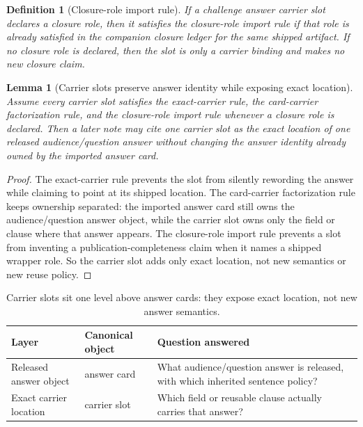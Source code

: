 \documentclass[11pt]{article}
\newtheorem{definition}{Definition}
\newtheorem{lemma}{Lemma}
\begin{document}
\begin{definition}[Closure-role import rule]
If a challenge answer carrier slot declares a closure role, then it satisfies the \emph{closure-role import rule} if that role is already satisfied in the companion closure ledger for the same shipped artifact.
If no closure role is declared, then the slot is only a carrier binding and makes no new closure claim.
\end{definition}

\begin{lemma}[Carrier slots preserve answer identity while exposing exact location]
Assume every carrier slot satisfies the exact-carrier rule, the card-carrier factorization rule, and the closure-role import rule whenever a closure role is declared.
Then a later note may cite one carrier slot as the exact location of one released audience/question answer without changing the answer identity already owned by the imported answer card.
\end{lemma}

\begin{proof}
The exact-carrier rule prevents the slot from silently rewording the answer while claiming to point at its shipped location.
The card-carrier factorization rule keeps ownership separated: the imported answer card still owns the audience/question answer object, while the carrier slot owns only the field or clause where that answer appears.
The closure-role import rule prevents a slot from inventing a publication-completeness claim when it names a shipped wrapper role.
So the carrier slot adds only exact location, not new semantics or new reuse policy.\qedhere
\end{proof}

\begin{table}[t]
\centering
\small
\begin{tabularx}{\linewidth}{@{}>{\raggedright\arraybackslash}X>{\raggedright\arraybackslash}X>{\raggedright\arraybackslash}X@{}}
\toprule
Layer & Canonical object & Question answered \\
\midrule
Released answer object & answer card & What audience/question answer is released, with which inherited sentence policy? \\
Exact carrier location & carrier slot & Which field or reusable clause actually carries that answer? \\
\bottomrule
\end{tabularx}
\caption{Carrier slots sit one level above answer cards: they expose exact location, not new answer semantics.}
\label{tab:answercarrierslots}
\end{table}
\end{document}
